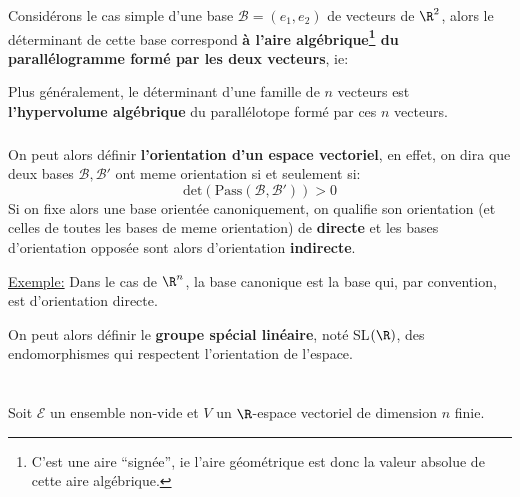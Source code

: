 Considérons le cas simple d'une base \(\mathscr{B} = (e_1, e_2)\) de vecteurs de \(\R^2\), alors le déterminant de cette base correspond \textbf{à l'aire algébrique\footnote[2]{C'est une aire ``signée'', ie l'aire géométrique est donc la valeur absolue de cette aire algébrique.} du parallélogramme formé par les deux vecteurs}, ie:
\begin{center}
\end{center}
Plus généralement, le déterminant d'une famille de \(n\) vecteurs est \textbf{l'hypervolume algébrique} du parallélotope formé par ces \(n\) vecteurs.\<

\subsection*{}
On peut alors définir \textbf{l'orientation d'un espace vectoriel}, en effet, on dira que deux bases \(\mathscr{B}, \mathscr{B'}\) ont meme orientation si et seulement si:
\[
   \text{det}(\text{Pass}(\mathscr{B}, \mathscr{B'})) > 0
\]
Si on fixe alors une base orientée canoniquement, on qualifie son orientation (et celles de toutes les bases de meme orientation) de \textbf{directe} et les bases d'orientation opposée sont alors d'orientation \textbf{indirecte}.\<

\underline{Exemple:} Dans le cas de \(\R^n\), la base canonique est la base qui, par convention, est d'orientation directe.\<

On peut alors définir le \textbf{groupe spécial linéaire}, noté SL\((\R)\), des endomorphismes qui respectent l'orientation de l'espace.

\chapter*{} %
Soit \(\mathscr{E}\) un ensemble non-vide et \(V\) un \(\R\)-espace vectoriel de dimension \(n\) finie.
